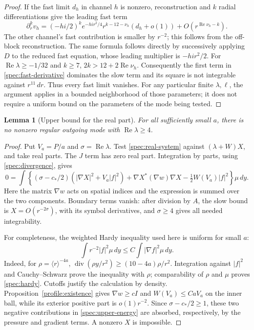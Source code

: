 \documentclass[11pt]{article}
\numberwithin{equation}{section}
\newtheorem{lemma}[theorem]{Lemma}
\theoremstyle{definition}
\theoremstyle{remark}
\begin{document}
\begin{proof}
If the fast limit $d_h$ in channel $h$ is nonzero, reconstruction and
$k$ radial differentiations give the leading fast term
\begin{equation}\label{spec:fast-derivative}
 \partial_r^k v_h=
 (-hi/2)^k e^{-hi r^2/4}r^{k-12-\nu_h}(d_h+o(1))
 +O(r^{\operatorname{Re}\nu_h-k}).
\end{equation}
The other channel's fast contribution is smaller by $r^{-2}$; this
follows from the off-block reconstruction. The same formula follows
directly by successively applying $D$ to the reduced fast equation,
whose leading multiplier is $-hi r^2/2$.
For $\operatorname{Re}\lambda\ge-1/32$ and $k\ge7$,
$2k>12+2\operatorname{Re}\nu_h$. Consequently the first term in
\eqref{spec:fast-derivative} dominates the slow term and its square is
not integrable against $r^{11}\,dr$. Thus every fast limit vanishes.
For any particular finite $\lambda,\ell$, the argument applies in a
bounded neighborhood of those parameters; it does not require a
uniform bound on the parameters of the mode being tested.
\end{proof}

\begin{lemma}[Upper bound for the real part]\label{spec:real-bound}
For all sufficiently small $a$, there is no nonzero regular outgoing
mode with $\operatorname{Re}\lambda\ge4$.
\end{lemma}

\begin{proof}
Put $V_a=P/a$ and $\sigma=\operatorname{Re}\lambda$. Test
\eqref{spec:real-system} against $(\lambda+W)X$, and take real parts.
The $J$ term has zero real part. Integration by parts, using
\eqref{spec:divergence}, gives
\begin{equation}\label{spec:upper-energy}
 0=\int\left\{(\sigma-c_*/2)(|\nabla X|^2+V_a|f|^2)
 +\nabla X^*(\nabla w)\nabla X
 -\tfrac12 W(V_a)|f|^2\right\}\mu\,dy.
\end{equation}
Here the matrix $\nabla w$ acts on spatial indices and the expression
is summed over the two components. Boundary terms vanish: after
division by $A$, the slow bound is $X=O(r^{-2\sigma})$, with its symbol
derivatives, and $\sigma\ge4$ gives all needed integrability.

For completeness, the weighted Hardy inequality used here is uniform
for small $a$:
\begin{equation}\label{spec:hardy}
 \int r^{-2}|f|^2\mu\,dy\le C\int|\nabla f|^2\mu\,dy.
\end{equation}
Indeed, for $\rho=\langle r\rangle^{-4a}$,
$\operatorname{div}(\rho y/r^2)\ge(10-4a)\rho/r^2$.
Integration against $|f|^2$ and Cauchy--Schwarz prove the inequality
with $\rho$; comparability of $\rho$ and $\mu$ proves
\eqref{spec:hardy}. Cutoffs justify the calculation by density.
Proposition~\ref{profile:existence} gives $\nabla w\ge cI$ and
$W(V_a)\le C a V_a$ on the inner ball, while its exterior positive
part is $o(1)r^{-2}$. Since $\sigma-c_*/2\ge1$, these two negative
contributions in \eqref{spec:upper-energy} are absorbed, respectively,
by the pressure and gradient terms. A nonzero $X$ is impossible.
\end{proof}
\end{document}
